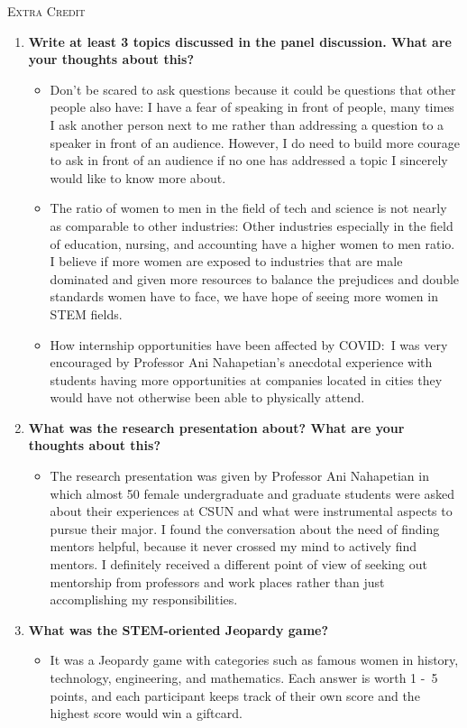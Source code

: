 \documentclass{article}
\begin{document}
\begin{center}
  \LARGE\textsc{Extra Credit}
\end{center}
\textsc{}
\begin{enumerate}
  \item \textbf{Write at least 3 topics discussed in the panel discussion. What are your thoughts about this?}
  \begin{itemize}
    \item Don’t be scared to ask questions because it could be questions that other people also have: I have a fear of speaking in front of people, many times I ask another person next to me rather than addressing a question to a speaker in front of an audience. However, I do need to build more courage to ask in front of an audience if no one has addressed a topic I sincerely would like to know more about.
    \item The ratio of women to men in the field of tech and science is not nearly as comparable to other industries: Other industries especially in the field of education, nursing, and accounting have a higher women to men ratio. I believe if more women are exposed to industries that are male dominated and given more resources to balance the prejudices and double standards women have to face, we have hope of seeing more women in STEM fields.
    \item How internship opportunities have been affected by COVID:\ I was very encouraged by Professor Ani Nahapetian’s anecdotal experience with students having more opportunities at companies located in cities they would have not otherwise been able to physically attend.
  \end{itemize}
  \item \textbf{What was the research presentation about? What are your thoughts about this?}
  \begin{itemize}
    \item The research presentation was given by Professor Ani Nahapetian in which almost 50 female undergraduate and graduate students were asked about their experiences at CSUN and what were instrumental aspects to pursue their major. I found the conversation about the need of finding mentors helpful, because it never crossed my mind to actively find mentors. I definitely received a different point of view of seeking out mentorship from professors and work places rather than just accomplishing my responsibilities.
  \end{itemize}
  \item \textbf{What was the STEM-oriented Jeopardy game?}
  \begin{itemize}
    \item It was a Jeopardy game with categories such as famous women in history, technology, engineering, and mathematics. Each answer is worth 1 -\ 5 points, and each participant keeps track of their own score and the highest score would win a giftcard.
  \end{itemize}
\end{enumerate}
\end{document}
